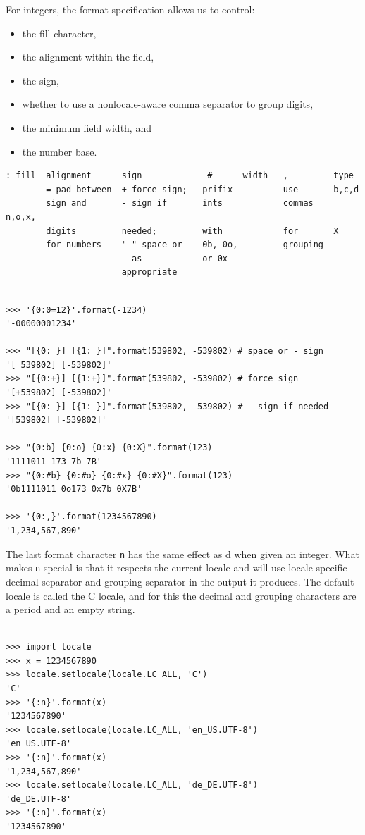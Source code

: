 For integers, the format specification allows us to control:
\begin{itemize}
\item the fill character, 
\item the alignment within the field, 
\item the sign, 
\item whether to use a nonlocale-aware comma separator to group digits, 
\item the minimum field width, and 
\item the number base.
\end{itemize}

\begin{tcolorbox}
\begin{verbatim}
: fill  alignment      sign             #      width   ,         type
        = pad between  + force sign;   prifix          use       b,c,d 
        sign and       - sign if       ints            commas    n,o,x,
        digits         needed;         with            for       X  
        for numbers    " " space or    0b, 0o,         grouping  
                       - as            or 0x  
                       appropriate
\end{verbatim}
\end{tcolorbox}


\begin{lstlisting}

>>> '{0:0=12}'.format(-1234)
'-00000001234'

>>> "[{0: }] [{1: }]".format(539802, -539802) # space or - sign 
'[ 539802] [-539802]'
>>> "[{0:+}] [{1:+}]".format(539802, -539802) # force sign 
'[+539802] [-539802]'
>>> "[{0:-}] [{1:-}]".format(539802, -539802) # - sign if needed 
'[539802] [-539802]'

>>> "{0:b} {0:o} {0:x} {0:X}".format(123)
'1111011 173 7b 7B'
>>> "{0:#b} {0:#o} {0:#x} {0:#X}".format(123)
'0b1111011 0o173 0x7b 0X7B'

>>> '{0:,}'.format(1234567890)
'1,234,567,890'
\end{lstlisting}


The last format character \verb|n| has the same effect as d when given an integer.
What makes \verb|n| special is that it respects the current locale and will use locale-specific decimal separator
and grouping separator in the output it produces.
The default locale is called the C locale, and for this the decimal and grouping characters are a period and an empty string.


\begin{lstlisting}

>>> import locale
>>> x = 1234567890
>>> locale.setlocale(locale.LC_ALL, 'C')
'C'
>>> '{:n}'.format(x)
'1234567890'
>>> locale.setlocale(locale.LC_ALL, 'en_US.UTF-8')
'en_US.UTF-8'
>>> '{:n}'.format(x)
'1,234,567,890'
>>> locale.setlocale(locale.LC_ALL, 'de_DE.UTF-8')
'de_DE.UTF-8'
>>> '{:n}'.format(x)
'1234567890'
\end{lstlisting}




